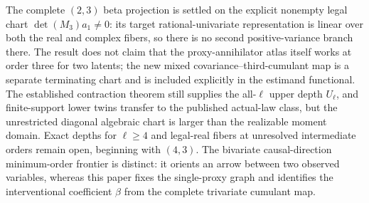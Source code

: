 \documentclass{article}
\begin{document}
The complete \((2,3)\) beta projection is settled on the explicit nonempty legal chart \(\det(M_3)a_1\ne0\): its target rational-univariate representation is linear over both the real and complex fibers, so there is no second positive-variance branch there. The result does not claim that the proxy-annihilator atlas itself works at order three for two latents; the new mixed covariance--third-cumulant map is a separate terminating chart and is included explicitly in the estimand functional. The established contraction theorem still supplies the all-\(\ell\) upper depth \(U_\ell\), and finite-support lower twins transfer to the published actual-law class, but the unrestricted diagonal algebraic chart is larger than the realizable moment domain. Exact depths for \(\ell\ge4\) and legal-real fibers at unresolved intermediate orders remain open, beginning with \((4,3)\). The bivariate causal-direction minimum-order frontier is distinct: it orients an arrow between two observed variables, whereas this paper fixes the single-proxy graph and identifies the interventional coefficient \(\beta\) from the complete trivariate cumulant map.
\end{document}
